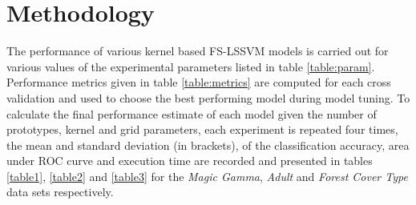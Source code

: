 \section{Methodology}
The performance of various kernel based FS-LSSVM models is carried out for various values of the experimental parameters listed in table \ref{table:param}. Performance metrics given in table \ref{table:metrics} are computed for each cross validation and used to choose the best performing model during model tuning. To calculate the final performance estimate of each model given the number of prototypes, kernel and grid parameters, each experiment is repeated four times, the mean and standard deviation (in brackets), of the classification accuracy, area under ROC curve and execution time are recorded and presented in tables \ref{table1}, \ref{table2} and \ref{table3} for the \textit{Magic Gamma}, \textit{Adult} and \textit{Forest Cover Type} data sets respectively.

\begin{table*}[!htbp]
\caption{Experiment Parameters}
\label{table:param}
\end{table*}

\clearpage

\begin{table*}[!htbp]
\caption{Metrics}
\label{table:metrics}
\centering
{}
\end{table*}

